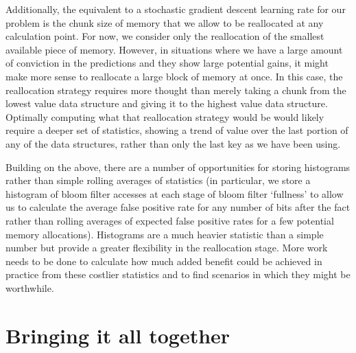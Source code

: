 \documentclass{sig-alternate-05-2015}
\begin{document}
Additionally, the equivalent to a stochastic gradient descent learning rate for our problem is the chunk size of memory that we allow to be reallocated at any calculation point. For now, we consider only the reallocation of the smallest available piece of memory. However, in situations where we have a large amount of conviction in the predictions and they show large potential gains, it might make more sense to reallocate a large block of memory at once. In this case, the reallocation strategy requires more thought than merely taking a chunk from the lowest value data structure and giving it to the highest value data structure. Optimally computing what that reallocation strategy would be would likely require a deeper set of statistics, showing a trend of value over the last portion of any of the data structures, rather than only the last key as we have been using.

Building on the above, there are a number of opportunities for storing histograms rather than simple rolling averages of statistics (in particular, we store a histogram of bloom filter accesses at each stage of bloom filter `fullness' to allow us to calculate the average false positive rate for any number of bits after the fact rather than rolling averages of expected false positive rates for a few potential memory allocations). Histograms are a much heavier statistic than a simple number but provide a greater flexibility in the reallocation stage. More work needs to be done to calculate how much added benefit could be achieved in practice from these costlier statistics and to find scenarios in which they might be worthwhile.

\section{Bringing it all together}


\small

\end{document}
